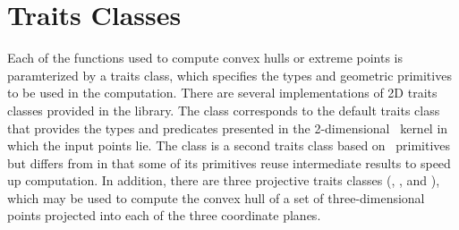 \section{Traits Classes}

Each of the functions used to compute convex hulls or extreme points
is paramterized by a traits class, which specifies the types and geometric
primitives to be used in the computation.  There are several implementations 
of 2D traits classes provided in the library.  The class
corresponds to the default traits class that provides the types and 
predicates presented in the 2-dimensional \cgal\ kernel in which the input 
points lie.  The class 
is a second traits class based on \cgal\ primitives but differs from
 in that some of its primitives reuse
intermediate results to speed up computation.
In addition, there are three projective traits classes 
(, 
, and 
), %
%
%
%
which may be used to compute the convex hull of a set of three-dimensional
points projected into each of the three coordinate planes.

